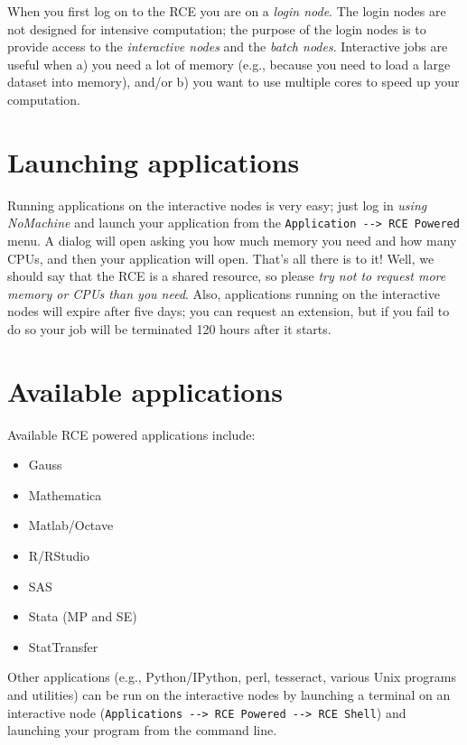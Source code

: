 \documentclass[]{book}
\providecommand{\tightlist}{%
  \setlength{\itemsep}{0pt}\setlength{\parskip}{0pt}}
\begin{document}
When you first log on to the RCE you are on a \emph{login node}. The
login nodes are not designed for intensive computation; the purpose of
the login nodes is to provide access to the \emph{interactive nodes} and
the \emph{batch nodes}. Interactive jobs are useful when a) you need a
lot of memory (e.g., because you need to load a large dataset into
memory), and/or b) you want to use multiple cores to speed up your
computation.

\section{Launching applications}\label{launching-applications}

Running applications on the interactive nodes is very easy; just log in
\emph{using NoMachine} and launch your application from the
\texttt{Application\ -\/-\textgreater{}\ RCE\ Powered} menu. A dialog
will open asking you how much memory you need and how many CPUs, and
then your application will open. That's all there is to it! Well, we
should say that the RCE is a shared resource, so please \emph{try not to
request more memory or CPUs than you need}. Also, applications running
on the interactive nodes will expire after five days; you can request an
extension, but if you fail to do so your job will be terminated 120
hours after it starts.

\section{Available applications}\label{available-applications}

Available RCE powered applications include:

\begin{itemize}
\tightlist
\item
  Gauss
\item
  Mathematica
\item
  Matlab/Octave
\item
  R/RStudio
\item
  SAS
\item
  Stata (MP and SE)
\item
  StatTransfer
\end{itemize}

Other applications (e.g., Python/IPython, perl, tesseract, various Unix
programs and utilities) can be run on the interactive nodes by launching
a terminal on an interactive node
(\texttt{Applications\ -\/-\textgreater{}\ RCE\ Powered\ -\/-\textgreater{}\ RCE\ Shell})
and launching your program from the command line.
\end{document}
